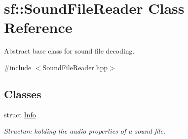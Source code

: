 \hypertarget{classsf_1_1_sound_file_reader}{}\section{sf\+:\+:Sound\+File\+Reader Class Reference}
\label{classsf_1_1_sound_file_reader}


Abstract base class for sound file decoding.  




{\ttfamily \#include $<$Sound\+File\+Reader.\+hpp$>$}

\subsection*{Classes}
\begin{DoxyCompactItemize}
\item 
struct \hyperlink{structsf_1_1_sound_file_reader_1_1_info}{Info}
\begin{DoxyCompactList}\small\item\em Structure holding the audio properties of a sound file. \end{DoxyCompactList}\end{DoxyCompactItemize}

